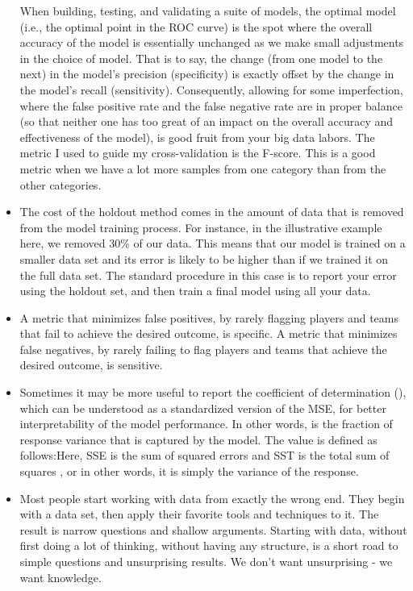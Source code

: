 \documentclass[]{book}
\begin{document}
\begin{itemize}
  When building, testing, and validating a suite of models, the optimal model (i.e., the optimal point in the ROC curve) is the spot where the overall accuracy of the model is essentially unchanged as we make small adjustments in the choice of model. That is to say, the change (from one model to the next) in the model's precision (specificity) is exactly offset by the change in the model's recall (sensitivity). Consequently, allowing for some imperfection, where the false positive rate and the false negative rate are in proper balance (so that neither one has too great of an impact on the overall accuracy and effectiveness of the model), is good fruit from your big data labors. The metric I used to guide my cross-validation is the F-score. This is a good metric when we have a lot more samples from one category than from the other categories.
\item
  The cost of the holdout method comes in the amount of data that is removed from the model training process. For instance, in the illustrative example here, we removed 30\% of our data. This means that our model is trained on a smaller data set and its error is likely to be higher than if we trained it on the full data set. The standard procedure in this case is to report your error using the holdout set, and then train a final model using all your data.
\item
  A metric that minimizes false positives, by rarely flagging players and teams that fail to achieve the desired outcome, is specific. A metric that minimizes false negatives, by rarely failing to flag players and teams that achieve the desired outcome, is sensitive.
\item
  Sometimes it may be more useful to report the coefficient of determination (), which can be understood as a standardized version of the MSE, for better interpretability of the model performance. In other words, is the fraction of response variance that is captured by the model. The value is defined as follows:Here, SSE is the sum of squared errors and SST is the total sum of squares , or in other words, it is simply the variance of the response.
\item
  Most people start working with data from exactly the wrong end. They begin with a data set, then apply their favorite tools and techniques to it. The result is narrow questions and shallow arguments. Starting with data, without first doing a lot of thinking, without having any structure, is a short road to simple questions and unsurprising results. We don't want unsurprising - we want knowledge.

\end{itemize}
\end{document}
